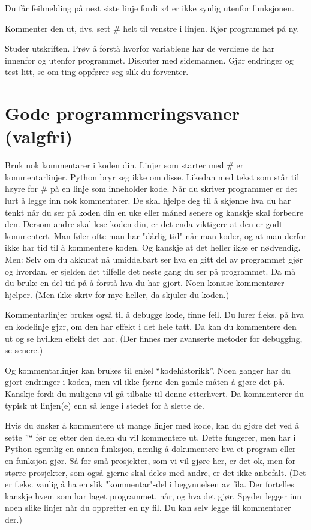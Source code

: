 Du får feilmelding på nest siste linje fordi x4 er ikke synlig utenfor funksjonen. 

Kommenter den ut, dvs. sett \# helt til venstre i linjen. Kjør programmet på ny.

Studer utskriften. Prøv å forstå hvorfor variablene har de verdiene de har innenfor og utenfor programmet. Diskuter med sidemannen. Gjør endringer og test litt, se om ting oppfører seg slik du forventer.

\section{Gode programmeringsvaner (valgfri)}

Bruk nok kommentarer i koden din. Linjer som starter med \# er kommentarlinjer. Python bryr seg ikke om disse. Likedan med tekst som står til høyre for \# på en linje som inneholder kode. Når du skriver programmer er det lurt å legge inn nok kommentarer. De skal hjelpe deg til å skjønne hva du har tenkt når du ser på koden din en uke eller måned senere og kanskje skal forbedre den. Dersom andre skal lese koden din, er det enda viktigere at den er godt kommentert. Man føler ofte man har "dårlig tid" når man koder, og at man derfor ikke har tid til å kommentere koden. Og kanskje at det heller ikke er nødvendig. Men: Selv om du akkurat nå umiddelbart ser hva en gitt del av programmet gjør og hvordan, er sjelden det tilfelle det neste gang du ser på programmet. Da må du bruke en del tid på å forstå hva du har gjort. Noen konsise kommentarer hjelper. (Men ikke skriv for mye heller, da skjuler du koden.) 

Kommentarlinjer brukes også til å debugge kode, finne feil. Du lurer f.eks. på hva en kodelinje gjør, om den har effekt i det hele tatt. Da kan du kommentere den ut og se hvilken effekt det har. (Der finnes mer avanserte metoder for debugging, se senere.)

Og kommentarlinjer kan brukes til enkel ``kodehistorikk''. Noen ganger har du gjort endringer i koden, men vil ikke fjerne den gamle måten å gjøre det på. Kanskje fordi du muligens vil gå tilbake til denne etterhvert. Da kommenterer du typisk ut linjen(e) enn så lenge i stedet for å slette de.

Hvis du ønsker å kommentere ut mange linjer med kode, kan du gjøre det ved å sette ''\textquotedbl`` før og etter den delen du vil kommentere ut. Dette fungerer, men har i Python egentlig en annen funksjon, nemlig å dokumentere hva et program eller en funksjon gjør. Så for små prosjekter, som vi vil gjøre her, er det ok, men for større prosjekter, som også gjerne skal deles med andre, er det ikke anbefalt.  (Det er f.eks. vanlig å ha en slik "kommentar"-del i begynnelsen av fila. Der fortelles kanskje hvem som har laget programmet, når, og hva det gjør. Spyder legger inn noen slike linjer når du oppretter en ny fil. Du kan selv legge til kommentarer der.) 

